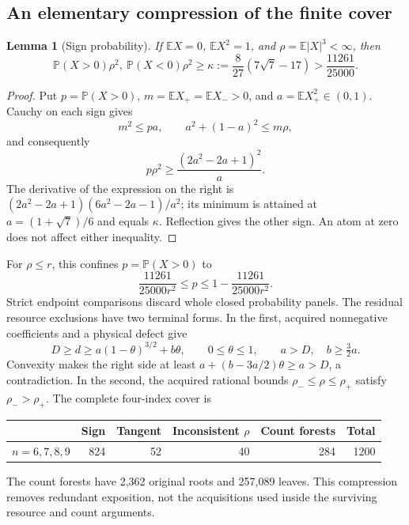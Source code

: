 \documentclass[11pt,a4paper]{article}
\newtheorem{lemma}[theorem]{Lemma}
\theoremstyle{definition}
\newcommand{\E}{\mathbb E}
\newcommand{\Pp}{\mathbb P}
\begin{document}
\subsection*{An elementary compression of the finite cover}

\begin{lemma}[Sign probability]
\label{cut6:lem:sign}
If \(\E X=0\), \(\E X^2=1\), and \(\rho=\E|X|^3<\infty\), then
\[
 \Pp(X>0)\rho^2,\ \Pp(X<0)\rho^2
 \ge\kappa:=\frac8{27}(7\sqrt7-17)>\frac{11261}{25000}.
\]
\end{lemma}
\begin{proof}
Put \(p=\Pp(X>0)\), \(m=\E X_+=\E X_->0\), and
\(a=\E X_+^2\in(0,1)\). Cauchy on each sign gives
\[
 m^2\le pa,\qquad a^2+(1-a)^2\le m\rho,
\]
and consequently
\[
 p\rho^2\ge\frac{(2a^2-2a+1)^2}{a}.
\]
The derivative of the expression on the right is
\((2a^2-2a+1)(6a^2-2a-1)/a^2\); its minimum is attained at
\(a=(1+\sqrt7)/6\) and equals \(\kappa\). Reflection gives the
other sign. An atom at zero does not affect either inequality.
\end{proof}

For \(\rho\le r\), this confines \(p=\Pp(X>0)\) to
\[
 \frac{11261}{25000r^2}\le p\le1-\frac{11261}{25000r^2}.
\]
Strict endpoint comparisons discard whole closed probability panels.
The residual resource exclusions have two terminal forms. In the first,
acquired nonnegative coefficients and a physical defect give
\[
 D\ge d\ge a(1-\theta)^{3/2}+b\theta,
 \qquad 0\le\theta\le1,\qquad a>D,\quad b\ge\tfrac32a.
\]
Convexity makes the right side at least
\(a+(b-3a/2)\theta\ge a>D\), a contradiction. In the second,
the acquired rational bounds \(\rho_-\le\rho\le\rho_+\) satisfy
\(\rho_->\rho_+\). The complete four-index cover is
\begin{center}
\begin{tabular}{@{}lrrrrr@{}}
\toprule
&Sign&Tangent&Inconsistent \(\rho\)&Count forests&Total\\
\midrule
\(n=6,7,8,9\)&824&52&40&284&1200\\
\bottomrule
\end{tabular}
\end{center}
The count forests have 2,362 original roots and 257,089 leaves.
This compression removes redundant exposition, not the acquisitions
used inside the surviving resource and count arguments.
\end{document}
